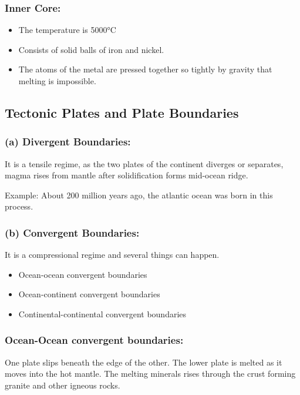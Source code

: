 \documentclass{article}
\begin{document}
\begin{multicols*}{2}
  \subsubsection*{Inner Core:}
  \begin{itemize}
    \item The temperature is 5000°C 
    \item Consists of solid balls of iron and nickel.
    \item  The atoms of the metal are pressed together so tightly by gravity that melting is impossible.  
  \end{itemize}

  \subsection*{Tectonic Plates and Plate Boundaries}
  \subsubsection*{(a) Divergent Boundaries:}
  It is a tensile regime, as the two plates of the continent diverges or separates, magma rises from mantle after solidification forms mid-ocean ridge. 

  Example: About 200 million years ago, the atlantic ocean was born in this process. 



  \subsubsection*{(b) Convergent Boundaries:}
  It is a compressional regime and several things can happen. 
  \begin{itemize}
    \item Ocean-ocean convergent boundaries 
    \item Ocean-continent convergent boundaries 
    \item Continental-continental convergent boundaries 
  \end{itemize}

  \subsubsection*{Ocean-Ocean convergent boundaries:}
  One plate slips beneath the edge of the other. The lower plate is melted as it moves into the hot mantle. The melting minerals rises through the crust forming granite and other igneous rocks.


\end{multicols*}
\end{document}
